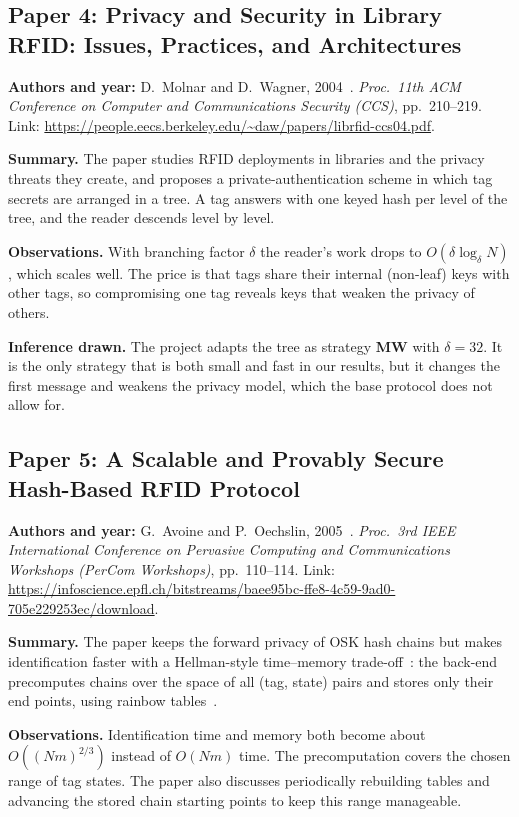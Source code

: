 \subsection*{Paper 4: Privacy and Security in Library RFID: Issues, Practices, and Architectures}
\textbf{Authors and year:} D.~Molnar and D.~Wagner, 2004~\cite{molnar}. \emph{Proc.\ 11th ACM Conference on Computer and Communications Security (CCS)}, pp.~210--219. Link: \url{https://people.eecs.berkeley.edu/~daw/papers/librfid-ccs04.pdf}.

\textbf{Summary.} The paper studies RFID deployments in libraries and the privacy threats they create, and proposes a private-authentication scheme in which tag secrets are arranged in a tree. A tag answers with one keyed hash per level of the tree, and the reader descends level by level.

\textbf{Observations.} With branching factor $\delta$ the reader's work drops to $O(\delta\log_\delta N)$, which scales well. The price is that tags share their internal (non-leaf) keys with other tags, so compromising one tag reveals keys that weaken the privacy of others.

\textbf{Inference drawn.} The project adapts the tree as strategy \textbf{MW} with $\delta=32$. It is the only strategy that is both small and fast in our results, but it changes the first message and weakens the privacy model, which the base protocol does not allow for.

\subsection*{Paper 5: A Scalable and Provably Secure Hash-Based RFID Protocol}
\textbf{Authors and year:} G.~Avoine and P.~Oechslin, 2005~\cite{avoine05}. \emph{Proc.\ 3rd IEEE International Conference on Pervasive Computing and Communications Workshops (PerCom Workshops)}, pp.~110--114. Link: \url{https://infoscience.epfl.ch/bitstreams/baee95bc-ffe8-4c59-9ad0-705e229253ec/download}.

\textbf{Summary.} The paper keeps the forward privacy of OSK hash chains but makes identification faster with a Hellman-style time--memory trade-off~\cite{hellman}: the back-end precomputes chains over the space of all (tag, state) pairs and stores only their end points, using rainbow tables~\cite{oechslin}.

\textbf{Observations.} Identification time and memory both become about $O((Nm)^{2/3})$ instead of $O(Nm)$ time. The precomputation covers the chosen range of tag states. The paper also discusses periodically rebuilding tables and advancing the stored chain starting points to keep this range manageable.

